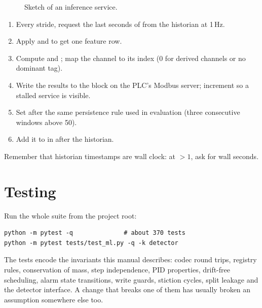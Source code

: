 \begin{figure}[htbp]
\centering
{}
\caption{Sketch of an inference service.}
\label{fig:inference}
\end{figure}

\begin{enumerate}
  \item Every stride, request the last  seconds of
         from the historian at 1\,Hz.
  \item Apply  and  to get one feature
        row.
  \item Compute  and ; map the channel to
        its  index (0 for derived channels or no dominant
        tag).
  \item Write the results to the  block on the PLC's Modbus
        server; increment  so a stalled service is visible.
  \item Set  after the same persistence rule used in
        evaluation (three consecutive windows above 50).
  \item Add it to  in  after
        the historian.
\end{enumerate}

Remember that historian timestamps are wall clock: at  $>1$, ask
for  wall seconds.

\section{Testing}

Run the whole suite from the project root:
\begin{lstlisting}[style=sh]
python -m pytest -q              # about 370 tests
python -m pytest tests/test_ml.py -q -k detector
\end{lstlisting}
The tests encode the invariants this manual describes: codec round trips,
registry rules, conservation of mass, step independence, PID properties,
drift-free scheduling, alarm state transitions, write guards, stiction
cycles, split leakage and the detector interface. A change that breaks one of
them has usually broken an assumption somewhere else too.
